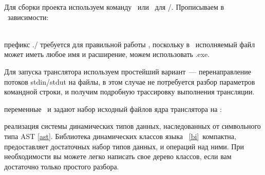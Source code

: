 
Для сборки проекта используем команду \ или \ для
\win/\mingw. Прописываем в \ зависимости:


\begin{description}

\item{}\\ префикс ./ требуется для правильной работы
, поскольку в \linux\ исполняемый файл может иметь любое имя и
расширение, можем использовать .exe.

Для запуска транслятора используем простейший вариант\ --- перенаправление
потоков stdin/stdut на файлы, в этом случае не потребуется разбор параметров
командной строки, и получим подробную трассировку выполнения трансляции.

\item{переменные \ и } задают набор исходный файлов ядра
транслятора на \cpp:

\begin{description}
\item{} реализация системы динамических типов данных,
наследованных от символьного типа AST \ref{ast}. Библиотека динамических классов
языка \bi\ \ref{bi}\ компактна, предоставляет достаточных набор типов
данных, и операций над ними. При необходимости вы можете легко написать свое
дерево классов, если вам достаточно только простого разбора.
\item{} 
\end{description}

\end{description}
